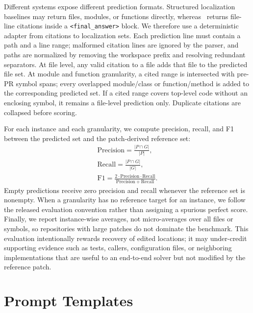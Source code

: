 \documentclass{llmxive}
\providecommand{\approach}{~}
\begin{document}
Different systems expose different prediction formats.
Structured localization baselines may return files, modules, or functions directly, whereas \approach returns file-line citations inside a \texttt{<final\_answer>} block.
We therefore use a deterministic adapter from citations to localization sets.
Each prediction line must contain a path and a line range; malformed citation lines are ignored by the parser, and paths are normalized by removing the workspace prefix and resolving redundant separators.
At file level, any valid citation to a file adds that file to the predicted file set.
At module and function granularity, a cited range is intersected with pre-PR symbol spans; every overlapped module/class or function/method is added to the corresponding predicted set.
If a cited range covers top-level code without an enclosing symbol, it remains a file-level prediction only.
Duplicate citations are collapsed before scoring.

For each instance and each granularity, we compute precision, recall, and F1 between the predicted set and the patch-derived reference set:
\begin{equation}
\begin{gathered}
\mathrm{Precision} = \frac{|P \cap G|}{|P|}, \\
\mathrm{Recall} = \frac{|P \cap G|}{|G|}, \\
\mathrm{F1} = \frac{2\cdot\mathrm{Precision}\cdot\mathrm{Recall}}{\mathrm{Precision}+\mathrm{Recall}}.
\end{gathered}
\end{equation}
Empty predictions receive zero precision and recall whenever the reference set is nonempty.
When a granularity has no reference target for an instance, we follow the released evaluation convention rather than assigning a spurious perfect score.
Finally, we report instance-wise averages, not micro-averages over all files or symbols, so repositories with large patches do not dominate the benchmark.
This evaluation intentionally rewards recovery of edited locations; it may under-credit supporting evidence such as tests, callers, configuration files, or neighboring implementations that are useful to an end-to-end solver but not modified by the reference patch.

\section{Prompt Templates}
\label{app:prompt-templates}
\end{document}
